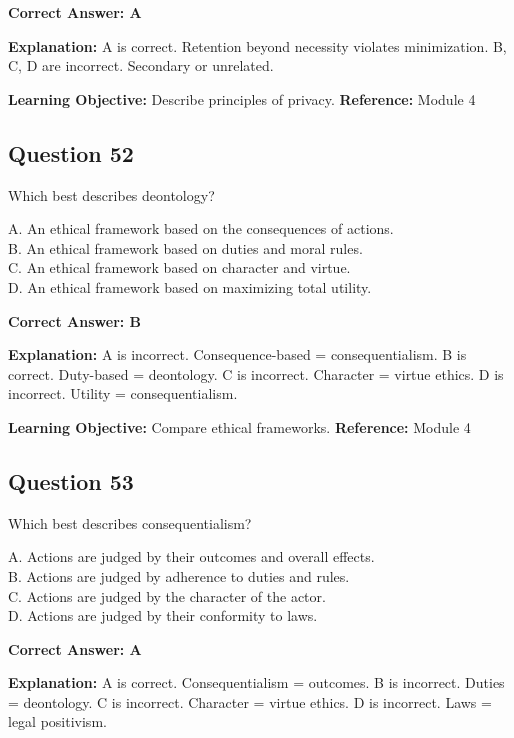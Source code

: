 \documentclass[11pt]{article}
\begin{document}
	\vspace{0.4em}
	\textbf{Correct Answer: A}
	
	\textbf{Explanation:}
	A is correct. Retention beyond necessity violates minimization.
	B, C, D are incorrect. Secondary or unrelated.
	
	\textbf{Learning Objective:} Describe principles of privacy.
	\textbf{Reference:} Module 4
	
	\subsection*{Question 52}
	Which best describes deontology?
	
	A. An ethical framework based on the consequences of actions.\\
	B. An ethical framework based on duties and moral rules.\\
	C. An ethical framework based on character and virtue.\\
	D. An ethical framework based on maximizing total utility.
	
	\vspace{0.4em}
	\textbf{Correct Answer: B}
	
	\textbf{Explanation:}
	A is incorrect. Consequence-based = consequentialism.
	B is correct. Duty-based = deontology.
	C is incorrect. Character = virtue ethics.
	D is incorrect. Utility = consequentialism.
	
	\textbf{Learning Objective:} Compare ethical frameworks.
	\textbf{Reference:} Module 4
	
	\subsection*{Question 53}
	Which best describes consequentialism?
	
	A. Actions are judged by their outcomes and overall effects.\\
	B. Actions are judged by adherence to duties and rules.\\
	C. Actions are judged by the character of the actor.\\
	D. Actions are judged by their conformity to laws.
	
	\vspace{0.4em}
	\textbf{Correct Answer: A}
	
	\textbf{Explanation:}
	A is correct. Consequentialism = outcomes.
	B is incorrect. Duties = deontology.
	C is incorrect. Character = virtue ethics.
	D is incorrect. Laws = legal positivism.
	
\end{document}
